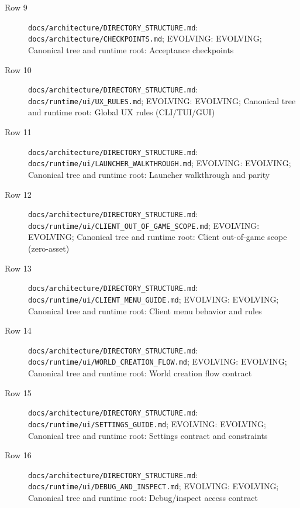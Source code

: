 \documentclass[9pt,a4paper,openany]{book}
\begin{document}
\begin{description}
\item[Row 9] \texttt{docs/\allowbreak{}architecture/\allowbreak{}DIRECTORY\_\allowbreak{}STRUCTURE.\allowbreak{}md}: \texttt{docs/\allowbreak{}architecture/\allowbreak{}CHECKPOINTS.\allowbreak{}md}; EVOLVING: EVOLVING; Canonical tree and runtime root: Acceptance checkpoints
\item[Row 10] \texttt{docs/\allowbreak{}architecture/\allowbreak{}DIRECTORY\_\allowbreak{}STRUCTURE.\allowbreak{}md}: \texttt{docs/\allowbreak{}runtime/\allowbreak{}ui/\allowbreak{}UX\_\allowbreak{}RULES.\allowbreak{}md}; EVOLVING: EVOLVING; Canonical tree and runtime root: Global UX rules (CLI/\allowbreak{}TUI/\allowbreak{}GUI)
\item[Row 11] \texttt{docs/\allowbreak{}architecture/\allowbreak{}DIRECTORY\_\allowbreak{}STRUCTURE.\allowbreak{}md}: \texttt{docs/\allowbreak{}runtime/\allowbreak{}ui/\allowbreak{}LAUNCHER\_\allowbreak{}WALKTHROUGH.\allowbreak{}md}; EVOLVING: EVOLVING; Canonical tree and runtime root: Launcher walkthrough and parity
\item[Row 12] \texttt{docs/\allowbreak{}architecture/\allowbreak{}DIRECTORY\_\allowbreak{}STRUCTURE.\allowbreak{}md}: \texttt{docs/\allowbreak{}runtime/\allowbreak{}ui/\allowbreak{}CLIENT\_\allowbreak{}OUT\_\allowbreak{}OF\_\allowbreak{}GAME\_\allowbreak{}SCOPE.\allowbreak{}md}; EVOLVING: EVOLVING; Canonical tree and runtime root: Client out-\allowbreak{}of-\allowbreak{}game scope (zero-\allowbreak{}asset)
\item[Row 13] \texttt{docs/\allowbreak{}architecture/\allowbreak{}DIRECTORY\_\allowbreak{}STRUCTURE.\allowbreak{}md}: \texttt{docs/\allowbreak{}runtime/\allowbreak{}ui/\allowbreak{}CLIENT\_\allowbreak{}MENU\_\allowbreak{}GUIDE.\allowbreak{}md}; EVOLVING: EVOLVING; Canonical tree and runtime root: Client menu behavior and rules
\item[Row 14] \texttt{docs/\allowbreak{}architecture/\allowbreak{}DIRECTORY\_\allowbreak{}STRUCTURE.\allowbreak{}md}: \texttt{docs/\allowbreak{}runtime/\allowbreak{}ui/\allowbreak{}WORLD\_\allowbreak{}CREATION\_\allowbreak{}FLOW.\allowbreak{}md}; EVOLVING: EVOLVING; Canonical tree and runtime root: World creation flow contract
\item[Row 15] \texttt{docs/\allowbreak{}architecture/\allowbreak{}DIRECTORY\_\allowbreak{}STRUCTURE.\allowbreak{}md}: \texttt{docs/\allowbreak{}runtime/\allowbreak{}ui/\allowbreak{}SETTINGS\_\allowbreak{}GUIDE.\allowbreak{}md}; EVOLVING: EVOLVING; Canonical tree and runtime root: Settings contract and constraints
\item[Row 16] \texttt{docs/\allowbreak{}architecture/\allowbreak{}DIRECTORY\_\allowbreak{}STRUCTURE.\allowbreak{}md}: \texttt{docs/\allowbreak{}runtime/\allowbreak{}ui/\allowbreak{}DEBUG\_\allowbreak{}AND\_\allowbreak{}INSPECT.\allowbreak{}md}; EVOLVING: EVOLVING; Canonical tree and runtime root: Debug/\allowbreak{}inspect access contract

\end{description}
\end{document}
